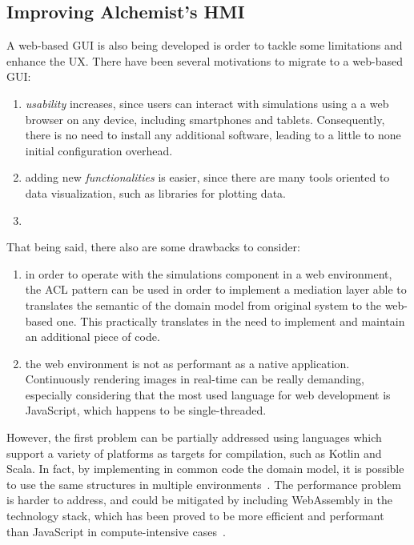 \documentclass[conference]{IEEEtran}
\begin{document}
\subsection{Improving Alchemist's \ac{HMI}}
A web-based \ac{GUI} is also being developed is order to tackle some limitations and enhance the \ac{UX}.
%
There have been several motivations to migrate to a web-based \ac{GUI}:
\begin{enumerate}
    \item \emph{usability} increases,
    since users can interact with simulations using a a web browser on any device,
    including smartphones and tablets.
    Consequently,
    there is no need to install any additional software,
    leading to a little to none initial configuration overhead.
    \item adding new \emph{functionalities} is easier,
    since there are many tools oriented to data visualization,
    such as libraries for plotting data.
    \item
\end{enumerate}
That being said,
there also are some drawbacks to consider:
\begin{enumerate}
    \item in order to operate with the simulations component in a web environment,
    the \ac{ACL} pattern can be used in order to implement a mediation layer able to translates the semantic of the domain model from original system to the web-based one.
    This practically translates in the need to implement and maintain an additional piece of code.
    \item the web environment is not as performant as a native application.
    Continuously rendering images in real-time can be really demanding,
    especially considering that the most used language for web development is JavaScript,
    which happens to be single-threaded.
\end{enumerate}

However,
the first problem can be partially addressed using languages which support a variety of platforms as targets for compilation,
such as Kotlin and Scala.
%
In fact,
by implementing in common code the domain model,
it is possible to use the same structures in multiple environments~\cite{DBLP:conf/dais/FilasetaP23}.
%
The performance problem is harder to address,
and could be mitigated by including WebAssembly in the technology stack,
which has been proved to be more efficient and performant than JavaScript in compute-intensive cases~\cite{DBLP:conf/ict4s/Macedo0PS22}.
%
\end{document}
